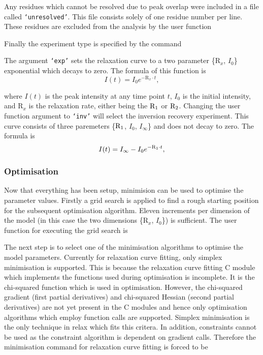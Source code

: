 
Any residues which cannot be resolved due to peak overlap were included in a file called \texttt{`unresolved'}.  This file consists solely of one residue number per line.  These residues are excluded from the analysis by the user function


Finally the experiment type is specified by the command


The argument \texttt{`exp'} sets the relaxation curve to a two parameter \{$\mathrm{R}_x$, $I_0$\} exponential which decays to zero.  The formula of this function is
\begin{equation}
 I(t) = I_0 e^{-\mathrm{R}_x \cdot t},
\end{equation}

\noindent where $I(t)$ is the peak intensity at any time point $t$, $I_0$ is the initial intensity, and $\mathrm{R}_x$ is the relaxation rate, either being the $\mathrm{R}_1$ or $\mathrm{R}_2$.  Changing the user function argument to \texttt{`inv'} will select the inversion recovery experiment.  This curve consists of three paremeters \{$\mathrm{R}_1$, $I_0$, $I_{\infty}$\} and does not decay to zero.  The formula is
\begin{equation}
 I(t) = I_{\infty} - I_0 e^{-\mathrm{R}_1 \cdot t},
\end{equation}


\subsubsection{Optimisation}

Now that everything has been setup, minimision can be used to optimise the parameter values.  Firstly a grid search is applied to find a rough starting position for the subsequent optimisation algorithm.  Eleven increments per dimension of the model (in this case the two dimensions \{$\mathrm{R}_x$, $I_0$\}) is sufficient.  The user function for executing the grid search is


The next step is to select one of the minimisation algorithms to optimise the model parameters.  Currently for relaxation curve fitting, only simplex minimisation is supported.  This is because the relaxation curve fitting C module which implements the functions used during optimisation is incomplete.  It is the chi-squared function which is used in optimisation.  However, the chi-squared gradient (first partial derivatives) and chi-squared Hessian (second partial derivatives) are not yet present in the C modules and hence only optimisation algorithms which employ function calls are supported.  Simplex minimisation is the only technique in relax which fits this critera.  In addition, constraints cannot be used as the constraint algorithm is dependent on gradient calls.  Therefore the minimisation command for relaxation curve fitting is forced to be

